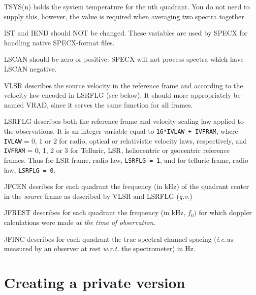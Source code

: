 \documentclass[11pt,twoside]{report}
\newcommand{\ie}{{\it i.e.\,}}
\begin{document}
\begin{description}
\item {} TSYS(n) holds the system temperature for the nth quadrant. 
        You do not need to supply this, however,
        the value is required when averaging two spectra
        together.

\item {} IST and IEND should NOT be changed. These variables are used
         by SPECX for handling native SPECX-format files.

\item {} LSCAN should be zero or positive: SPECX will not process spectra
         which have LSCAN negative.

\item {} VLSR describes the source velocity in the reference frame and
         according to the velocity law encoded in LSRFLG (see below). It
         should more appropriately be named VRAD, since it serves the same
         function for all frames.

\item {} LSRFLG describes both the reference frame and velocity scaling law
         applied to the observations. It is an integer variable equal to 
         \verb$16*IVLAW + IVFRAM$, where \verb+IVLAW+ = 0, 1 or 2 for
         radio, optical or relativistic velocity laws, respectively, and
         \verb+IVFRAM+ = 0, 1, 2 or 3 for Telluric, LSR, heliocentric
         or geocentric reference frames. Thus for LSR frame, radio law,
         \verb+LSRFLG = 1+, and for telluric frame, radio law,
         \verb+LSRFLG = 0+.

\item {} JFCEN desribes for each quadrant the frequency (in kHz) of the
         quadrant center in the {\em source} frame as described by VLSR
         and LSRFLG ({\em q.v.})

\item {} JFREST describes for each quadrant the frequency (in kHz, $f_0)$ for which
         doppler calculations were made {\em at the time of observation}.

\item {} JFINC describes for each quadrant the true spectral channel spacing
         (\ie as measured by an observer at rest {\em w.r.t.} the spectrometer)
         in Hz.

\end{description}

\newpage
\chapter{Creating a private version} 
\end{document}
